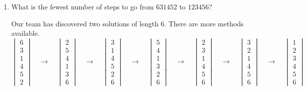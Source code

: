 \begin{enumerate}[leftmargin=*] 
\item What is the fewest number of steps to go from $631452$ to $123456$? 
\begin{solution}Our team has discovered two solutions of length 6. There are more methods available. 
$$
\begin{vmatrix} 6 \\ 3\\ 1\\ 4\\ 5\\ 2 \end{vmatrix}
\quad
\rightarrow
\quad 
\begin{vmatrix}2\\5\\4\\1\\3\\6 \end{vmatrix}
\quad
\rightarrow
\quad 
\begin{vmatrix}3\\1\\4\\5\\2\\6 \end{vmatrix}
\quad
\rightarrow
\quad 
\begin{vmatrix}5\\4\\1\\3\\2\\6 \end{vmatrix}
\quad
\rightarrow
\quad 
\begin{vmatrix}2\\3\\1\\4\\5\\6 \end{vmatrix}
\quad
\rightarrow
\quad 
\begin{vmatrix}3\\2\\1\\4\\5\\6 \end{vmatrix}
\quad
\rightarrow
\quad 
\begin{vmatrix}1\\2\\3\\4\\5\\6 \end{vmatrix}
$$
\end{solution}
\end{enumerate}
